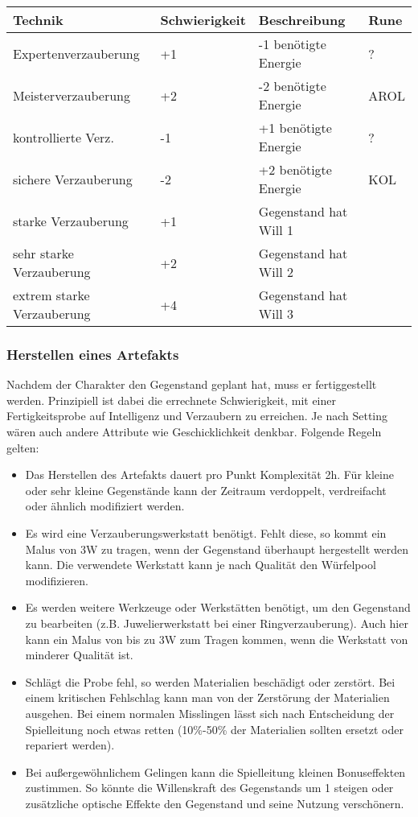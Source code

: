 \documentclass{article}
\begin{document}
\begin{small}
\begin{tabular}{|m{4cm}|m{3cm}|m{4cm}|m{2cm}|}
\hline
\textbf{Technik}&\textbf{Schwierigkeit}&\textbf{Beschreibung}&\textbf{Rune}\\
\hline
\hline
Expertenverzauberung&+1&-1 benötigte Energie&?\\
\hline
Meisterverzauberung&+2&-2 benötigte Energie&AROL\\
\hline
kontrollierte Verz.&-1&+1 benötigte Energie&?\\
\hline
sichere Verzauberung&-2&+2 benötigte Energie&KOL\\
\hline
starke Verzauberung&+1&Gegenstand hat Will 1& \\
\hline
sehr starke Verzauberung&+2&Gegenstand hat Will 2& \\
\hline
extrem starke Verzauberung&+4&Gegenstand hat Will 3& \\
\hline
\end{tabular}
\end{small}

\subsubsection{Herstellen eines Artefakts}

Nachdem der Charakter den Gegenstand geplant hat, muss er fertiggestellt werden. Prinzipiell ist dabei die
errechnete Schwierigkeit, mit einer Fertigkeitsprobe auf Intelligenz und Verzaubern zu erreichen. Je nach Setting
wären auch andere Attribute wie Geschicklichkeit denkbar. Folgende Regeln gelten:

\begin{itemize}
\item Das Herstellen des Artefakts dauert pro Punkt Komplexität 2h. Für kleine oder sehr kleine Gegenstände kann der Zeitraum verdoppelt, verdreifacht oder ähnlich modifiziert werden.
\item Es wird eine Verzauberungswerkstatt benötigt. Fehlt diese, so kommt ein Malus von 3W zu tragen, wenn der Gegenstand überhaupt hergestellt werden kann. Die verwendete Werkstatt kann je nach Qualität den Würfelpool modifizieren.
\item Es werden weitere Werkzeuge oder Werkstätten benötigt, um den Gegenstand zu bearbeiten (z.B. Juwelierwerkstatt bei einer Ringverzauberung). Auch hier kann ein Malus von bis zu 3W zum Tragen kommen, wenn die Werkstatt von minderer Qualität ist.
\item Schlägt die Probe fehl, so werden Materialien beschädigt oder zerstört. Bei einem kritischen Fehlschlag kann man von der Zerstörung der Materialien ausgehen. Bei einem normalen Misslingen lässt sich nach Entscheidung der Spielleitung noch etwas retten (10\%-50\% der Materialien sollten ersetzt oder repariert werden).
\item Bei außergewöhnlichem Gelingen kann die Spielleitung kleinen Bonuseffekten zustimmen. So könnte die Willenskraft des Gegenstands um 1 steigen oder zusätzliche optische Effekte den Gegenstand und seine Nutzung verschönern.
\end{itemize}
\end{document}
